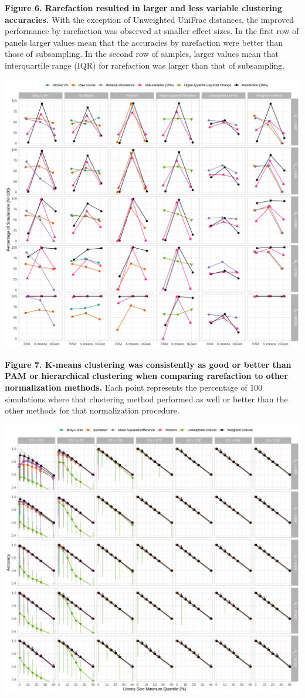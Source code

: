 \documentclass[
]{article}
\begin{document}
\textbf{Figure 6. Rarefaction resulted in larger and less variable
clustering accuracies.} With the exception of Unweighted UniFrac
distances, the improved performance by rarefaction was observed at
smaller effect sizes. In the first row of panels larger values mean that
the accuracies by rarefaction were better than those of subsampling. In
the second row of samples, larger values mean that interquartile range
(IQR) for rarefaction was larger than that of subsampling.

\newpage

\includegraphics{figure_07.png}

\textbf{Figure 7. K-means clustering was consistently as good or better
than PAM or hierarchical clustering when comparing rarefaction to other
normalization methods.} Each point represents the percentage of 100
simulations where that clustering method performed as well or better
than the other methods for that normalization procedure.

\newpage

\includegraphics{figure_08.png}
\end{document}
